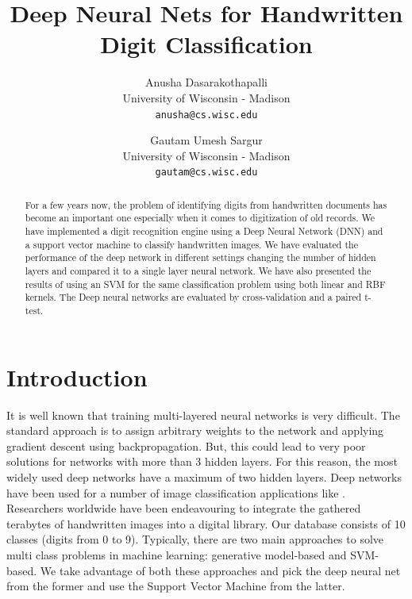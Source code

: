 \documentclass[10pt,twocolumn,letterpaper]{article}
\begin{document}
\title{Deep Neural Nets for Handwritten Digit Classification}

\author{Anusha Dasarakothapalli\\
University of Wisconsin - Madison\\
{\tt\small anusha@cs.wisc.edu}
\and
Gautam Umesh Sargur\\
University of Wisconsin - Madison\\
{\tt\small gautam@cs.wisc.edu}
}

\maketitle
\thispagestyle{empty}
\begin{abstract}
   For a few years now, the problem of identifying digits from handwritten documents has become an important one especially when it comes to digitization of old records. We have implemented a digit recognition engine using a Deep Neural Network (DNN) and a support vector machine to classify handwritten images. We have evaluated the performance of the deep network in different settings changing the number of hidden layers and compared it to a single layer neural network. We have also presented the results of using an SVM for the same classification problem using both linear and RBF kernels. The Deep neural networks are evaluated by cross-validation and a paired t-test.
\end{abstract}

\section{Introduction}

It is well known that training multi-layered neural networks is very difficult. The standard approach is to assign arbitrary weights to the network and applying gradient descent using backpropagation. But, this could lead to very poor solutions for networks with more than 3 hidden layers. For this reason, the most widely used deep networks have a maximum of two hidden layers. Deep networks have been used for a number of image classification applications like \cite{Schmidhuber:2012:MDN:2354409.2354694}.\\

Researchers worldwide have been endeavouring to integrate the gathered terabytes of handwritten images into a digital library. Our database consists of 10 classes (digits from 0 to 9). Typically, there are two main approaches to solve multi class problems in machine learning: generative model-based and SVM-based. We take advantage of both these approaches and pick the deep neural net from the former and use the Support Vector Machine from the latter.\\
\end{document}
